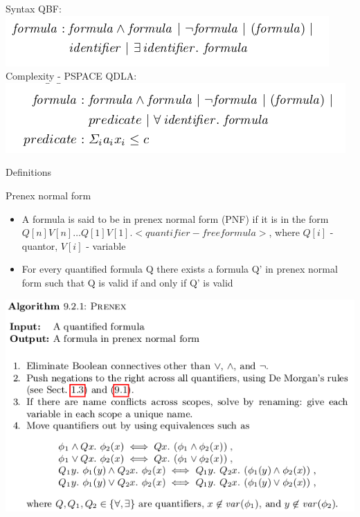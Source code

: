 \documentclass{beamer}
\begin{document}
\begin{frame}{Syntax}
QBF:\newline
\includegraphics[scale=0.5]{qbf.png}\newline
Complexity - PSPACE\newline
QDLA:\newline
\includegraphics[scale=0.5]{qdla.png}\newline
\end{frame}

\begin{frame}{Definitions}
\begin{block}{Prenex normal form}
\begin{itemize}
\item A formula is said to be in prenex normal form (PNF) if it is in the form $Q[n]V[n]\dots Q[1]V[1].<quantifier-free formula>$, where $Q[i]$ - quantor, $V[i]$ - variable
\item For every quantified formula Q there exists a formula Q' in prenex normal form such that Q is valid if and only if Q' is valid
\end{itemize}
\end{block}
\end{frame}

\begin{frame}
\includegraphics[scale=0.5]{prenex.png}\newline
\end{frame}
\end{document}

